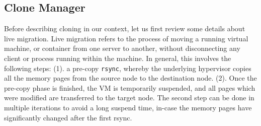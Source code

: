  \subsection{Clone Manager} 
\label{sec:CloneManager}



Before describing cloning in our context, let us first review some details about live migration. 
Live migration refers to the process of moving a running virtual machine, or container from one server to another, without disconnecting any client or process running within the machine. 
In general, this involves the following steps: 
(1). a pre-copy \texttt{rsync}, whereby the underlying hypervisor copies all the memory pages from the source node to the destination node. 
(2). Once the pre-copy phase is finished, the VM is temporarily suspended, and all pages which were modified are transferred to the target node. 
The second step can be done in multiple iterations to avoid a long suspend time, in-case the memory pages have significantly changed after the first rsync. 

